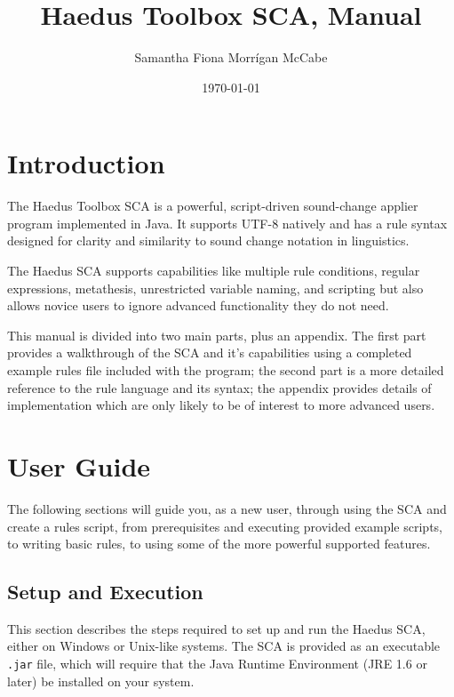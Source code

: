 \documentclass[10pt,letterpaper]{article}
\title{Haedus Toolbox SCA, Manual}
\author{Samantha Fiona Morrígan McCabe}
\date{\today}
\begin{document}
\maketitle
\tableofcontents

\section*{Introduction} 
\label{sec:introduction}
The Haedus Toolbox SCA is a powerful, script-driven sound-change applier program implemented in Java. It supports UTF-8 natively and has a rule syntax designed for clarity and similarity to sound change notation in linguistics.

The Haedus SCA supports capabilities like multiple rule conditions, regular expressions, metathesis, unrestricted variable naming, and scripting but also allows novice users to ignore advanced functionality they do not need.

This manual is divided into two main parts, plus an appendix. The first part provides a walkthrough of the SCA and it's capabilities using a completed example rules file included with the program; the second part is a more detailed reference to the rule language and its syntax; the appendix provides details of implementation which are only likely to be of interest to more advanced users.


\section{User Guide} 
\label{sec:user_guide}
The following sections will guide you, as a new user, through using the SCA and create a rules script, from prerequisites and executing provided example scripts, to writing basic rules, to using some of the more powerful supported features.


\subsection{Setup and Execution}
\label{sub:setup_and_execution}
This section describes the steps required to set up and run the Haedus SCA, either on Windows or Unix-like systems. The SCA is provided as an executable \texttt{.jar} file, which will require that the Java Runtime Environment (JRE 1.6 or later) be installed on your system.
\end{document}
